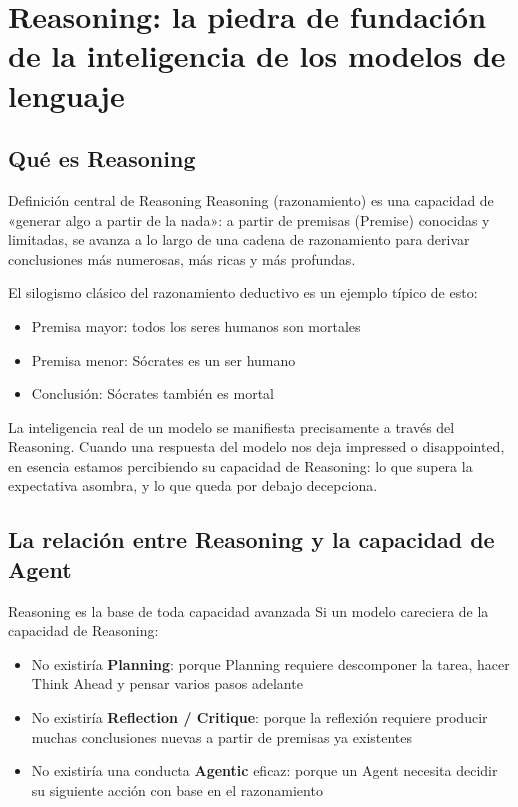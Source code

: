\section{Reasoning: la piedra de fundación de la inteligencia de los modelos de lenguaje}

\subsection{Qué es Reasoning}

\begin{importantbox}{Definición central de Reasoning}
Reasoning (razonamiento) es una capacidad de «generar algo a partir de la nada»: a partir de premisas (Premise) conocidas y limitadas, se avanza a lo largo de una cadena de razonamiento para derivar conclusiones más numerosas, más ricas y más profundas.
\end{importantbox}

El silogismo clásico del razonamiento deductivo es un ejemplo típico de esto:
\begin{itemize}
    \item Premisa mayor: todos los seres humanos son mortales
    \item Premisa menor: Sócrates es un ser humano
    \item Conclusión: Sócrates también es mortal
\end{itemize}

La inteligencia real de un modelo se manifiesta precisamente a través del Reasoning. Cuando una respuesta del modelo nos deja impressed o disappointed, en esencia estamos percibiendo su capacidad de Reasoning: lo que supera la expectativa asombra, y lo que queda por debajo decepciona.

\subsection{La relación entre Reasoning y la capacidad de Agent}

\begin{knowledgebox}{Reasoning es la base de toda capacidad avanzada}
Si un modelo careciera de la capacidad de Reasoning:
\begin{itemize}
    \item No existiría \textbf{Planning}: porque Planning requiere descomponer la tarea, hacer Think Ahead y pensar varios pasos adelante
    \item No existiría \textbf{Reflection / Critique}: porque la reflexión requiere producir muchas conclusiones nuevas a partir de premisas ya existentes
    \item No existiría una conducta \textbf{Agentic} eficaz: porque un Agent necesita decidir su siguiente acción con base en el razonamiento
\end{itemize}
\end{knowledgebox}

